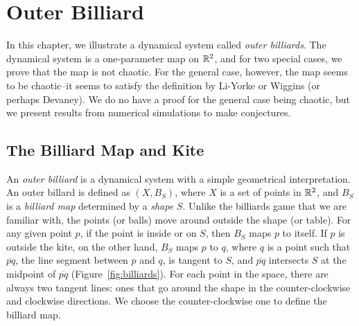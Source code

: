 \documentclass[12pt,twoside]{book}
\begin{document}
\chapter{Outer Billiard}
In this chapter, we illustrate a dynamical system called \textit{outer billiards}.
The dynamical system is a one-parameter map on $\mathbb{R}^2$, and for two special cases, we prove that the map is not chaotic.
For the general case, however, the map seems to be chaotic--it seems to satisfy the definition by Li-Yorke or Wiggins (or perhaps Devaney).
We do no have a proof for the general case being chaotic, but we present results from numerical simulations to make conjectures.

\section{The Billiard Map and Kite}
An \textit{outer billiard} is a dynamical system with a simple geometrical interpretation.
An outer billard is defined as $(X, B_S)$, where $X$ is a set of points in $\mathbb{R}^2$, and $B_S$ is a \textit{billiard map} determined by a \textit{shape} $S$.
Unlike the billiards game that we are familiar with, the points (or balls) move around outside the shape (or table).
For any given point $p$, if the point is inside or on $S$, then $B_S$ maps $p$ to itself.
If $p$ is outside the kite, on the other hand, $B_S$ maps $p$ to $q$, where $q$ is a point such that $\overline{pq}$, the line segment between $p$ and $q$, is tangent to $S$, and $\overline{pq}$ intersects $S$ at the midpoint of $\overline{pq}$ (Figure~\ref{fig:billiards}).
For each point in the space, there are always two tangent lines: ones that go around the shape in the counter-clockwise and clockwise directions.
We choose the counter-clockwise one to define the billiard map.
\end{document}
